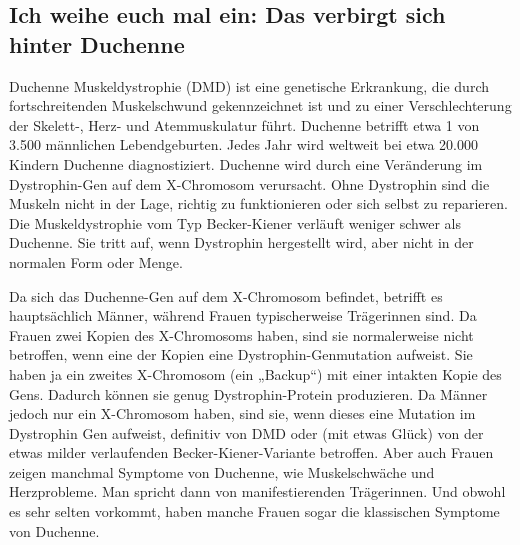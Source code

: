 \documentclass[fontsize=14pt,a4paper,headinclude,DIV=calc,automark]{scrbook}
\begin{document}
\subsection{Ich weihe euch mal ein: Das verbirgt sich hinter Duchenne}
\label{sec:muskeldystrophie}

Duchenne Muskeldystrophie (DMD) ist eine genetische Erkrankung, die durch fortschreitenden Muskelschwund gekennzeichnet ist und zu einer Verschlechterung der Skelett-, Herz- und Atemmuskulatur führt. Duchenne betrifft etwa 1 von 3.500 männlichen Lebendgeburten. Jedes Jahr wird weltweit bei etwa 20.000 Kindern Duchenne diagnostiziert. Duchenne wird durch eine Veränderung im Dystrophin-Gen auf dem X-Chromosom verursacht. Ohne Dystrophin sind die Muskeln nicht in der Lage, richtig zu funktionieren oder sich selbst zu reparieren. Die Muskeldystrophie vom Typ Becker-Kiener verläuft weniger schwer als Duchenne. Sie tritt auf, wenn Dystrophin hergestellt wird, aber nicht in der normalen Form oder Menge.

Da sich das Duchenne-Gen auf dem X-Chromosom befindet, betrifft es hauptsächlich Männer, während Frauen typischerweise Trägerinnen sind. Da Frauen zwei Kopien des X-Chromosoms haben, sind sie normalerweise nicht betroffen, wenn eine der Kopien eine Dystrophin-Genmutation aufweist. Sie haben ja ein zweites X-Chromosom (ein „Backup“) mit einer intakten Kopie des Gens. Dadurch können sie genug Dystrophin-Protein produzieren. Da Männer jedoch nur ein X-Chromosom haben, sind sie, wenn dieses eine Mutation im Dystrophin Gen aufweist, definitiv von DMD oder (mit etwas Glück) von der etwas milder verlaufenden Becker-Kiener-Variante betroffen. Aber auch Frauen zeigen manchmal Symptome von Duchenne, wie Muskelschwäche und Herzprobleme. Man spricht dann von manifestierenden Trägerinnen. Und obwohl es sehr selten vorkommt, haben manche Frauen sogar die klassischen Symptome von Duchenne.
\end{document}

